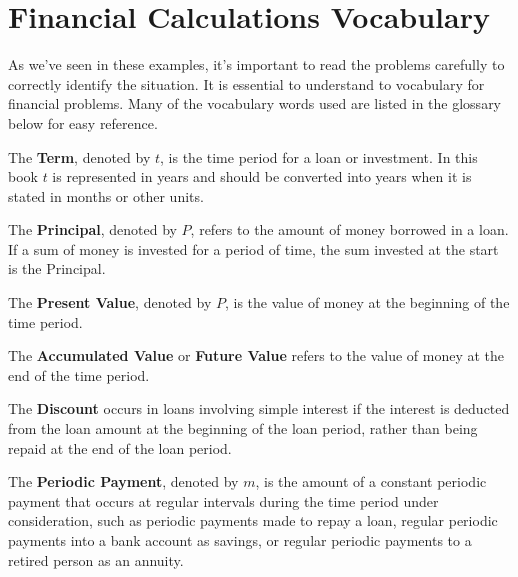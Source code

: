 \section{Financial Calculations Vocabulary}

As we’ve seen in these examples, it’s important to read the problems carefully to correctly identify the situation.  It is essential to understand to vocabulary for financial problems.  Many of the vocabulary words used are listed in the glossary below for easy reference.

\begin{definition}
    The \textbf{Term}, denoted by $t$, is the time period for a loan or investment.  In this book $t$ is represented in years and should be converted into years when it is stated in months or other units.
\end{definition}

\begin{definition}
    The \textbf{Principal}, denoted by \(P\), refers to the amount of money borrowed in a loan. If a sum of money is invested for a period of time, the sum invested at the start is the Principal.
\end{definition}

\begin{definition}
    The \textbf{Present Value}, denoted by \(P\), is the value of money at the beginning of the time period.
\end{definition}

\begin{definition}
    The \textbf{Accumulated Value} or \textbf{Future Value} refers to the value of money at the end of the time period.
\end{definition}

\begin{definition}
    The \textbf{Discount} occurs in loans involving simple interest if the interest is deducted from the loan amount at the beginning of the loan period, rather than being repaid at the end of the loan period.
\end{definition}

\begin{definition}
    The \textbf{Periodic Payment}, denoted by \(m\), is the amount of a constant periodic payment that occurs at regular intervals during the time period under consideration, such as periodic payments made to repay a loan, regular periodic payments into a bank account as savings, or regular periodic payments to a retired person as an annuity.
\end{definition}

